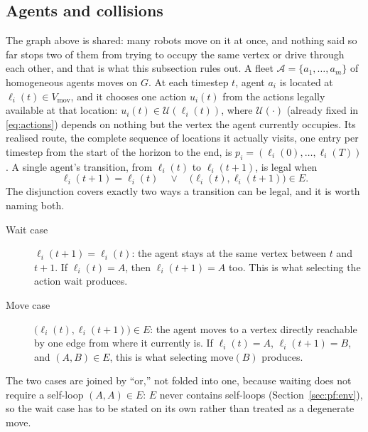 \documentclass[../main.tex]{subfiles}
\begin{document}
\subsection{Agents and collisions}
\label{sec:pf:agents}

The graph above is shared: many robots move on it at once, and nothing said so
far stops two of them from trying to occupy the same vertex or drive through
each other, and that is what this subsection rules out. A fleet
$\mathcal{A} = \{a_1,\dots,a_m\}$ of homogeneous agents moves on $G$.
At each timestep $t$, agent $a_i$ is located at $\ell_i(t) \in V_{\mathrm{mov}}$,
and it chooses one action $u_i(t)$ from the actions legally available at that
location: $u_i(t) \in \mathcal{U}(\ell_i(t))$, where $\mathcal{U}(\cdot)$
(already fixed in \eqref{eq:actions}) depends on nothing but the vertex the
agent currently occupies. Its realised route, the complete sequence of
locations it actually visits, one entry per timestep from the start of the
horizon to the end, is $p_i = (\ell_i(0), \dots, \ell_i(T))$. A single
agent's transition, from $\ell_i(t)$ to $\ell_i(t+1)$, is legal when
\begin{equation}
  \ell_i(t+1) = \ell_i(t)
  \quad \vee \quad
  \bigl(\ell_i(t), \ell_i(t+1)\bigr) \in E .
  \label{eq:transition}
\end{equation}
The disjunction covers exactly two ways a transition can be legal, and it is
worth naming both.
\begin{description}
  \item[Wait case] $\ell_i(t+1) = \ell_i(t)$: the agent stays at the same
    vertex between $t$ and $t+1$. If $\ell_i(t) = A$, then $\ell_i(t+1) = A$
    too. This is what selecting the action $\mathrm{wait}$ produces.
  \item[Move case] $\bigl(\ell_i(t), \ell_i(t+1)\bigr) \in E$: the agent
    moves to a vertex directly reachable by one edge from where it currently
    is. If $\ell_i(t) = A$, $\ell_i(t+1) = B$, and $(A,B) \in E$, this is
    what selecting $\mathrm{move}(B)$ produces.
\end{description}
The two cases are joined by ``or,'' not folded into one, because waiting
does not require a self-loop $(A,A) \in E$: $E$ never contains self-loops
(Section~\ref{sec:pf:env}), so the wait case has to be stated on its own
rather than treated as a degenerate move.
\end{document}
